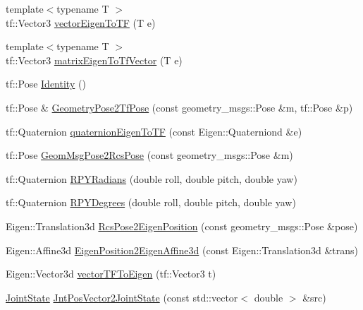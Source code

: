 \begin{DoxyCompactItemize}
\item 
{\footnotesize template$<$typename T $>$ }\\tf\-::\-Vector3 \hyperlink{namespaceConversion_a7c6bca05a5bcc1e50eb0726cc6afb6bc}{vector\-Eigen\-To\-T\-F} (T e)
\item 
{\footnotesize template$<$typename T $>$ }\\tf\-::\-Vector3 \hyperlink{namespaceConversion_a897add416eb33b4d1f1a9e8d0977e07c}{matrix\-Eigen\-To\-Tf\-Vector} (T e)
\item 
tf\-::\-Pose \hyperlink{namespaceConversion_a6b311daa62f5258ff8682031bb6a4d7c}{Identity} ()
\item 
tf\-::\-Pose \& \hyperlink{namespaceConversion_a396603f38f3dab910d8ce964cff12204}{Geometry\-Pose2\-Tf\-Pose} (const geometry\-\_\-msgs\-::\-Pose \&m, tf\-::\-Pose \&p)
\item 
tf\-::\-Quaternion \hyperlink{namespaceConversion_a2c2186b700a97c1d18527fdd59415d65}{quaternion\-Eigen\-To\-T\-F} (const Eigen\-::\-Quaterniond \&e)
\item 
tf\-::\-Pose \hyperlink{namespaceConversion_a21eaa442bffc9a5b68d43367b7f957c8}{Geom\-Msg\-Pose2\-Rcs\-Pose} (const geometry\-\_\-msgs\-::\-Pose \&m)
\item 
tf\-::\-Quaternion \hyperlink{namespaceConversion_a35388c46e6dd56509e1998c48e545fd6}{R\-P\-Y\-Radians} (double roll, double pitch, double yaw)
\item 
tf\-::\-Quaternion \hyperlink{namespaceConversion_ae5a5fe4357248756784a320a04cc750e}{R\-P\-Y\-Degrees} (double roll, double pitch, double yaw)
\item 
Eigen\-::\-Translation3d \hyperlink{namespaceConversion_a5e1276951986d337a31c9706293ba82e}{Rcs\-Pose2\-Eigen\-Position} (const geometry\-\_\-msgs\-::\-Pose \&pose)
\item 
Eigen\-::\-Affine3d \hyperlink{namespaceConversion_a1b98ebb4727f5887e0ed38d1c6a69820}{Eigen\-Position2\-Eigen\-Affine3d} (const Eigen\-::\-Translation3d \&trans)
\item 
Eigen\-::\-Vector3d \hyperlink{namespaceConversion_a51ccad105758098b6017b2cbb7b60759}{vector\-T\-F\-To\-Eigen} (tf\-::\-Vector3 t)
\item 
\hyperlink{RCS_8h_aa4adb93a26caa4dacba9c9614e283245}{Joint\-State} \hyperlink{namespaceConversion_a2f44351b0c6988428d99bff1c61d838c}{Jnt\-Pos\-Vector2\-Joint\-State} (const std\-::vector$<$ double $>$ \&src)
\end{DoxyCompactItemize}


